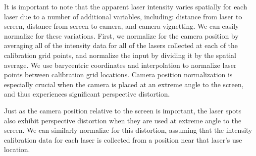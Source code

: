 \documentclass[review]{vgtc}                 %
\begin{document}

It is important to note that the apparent laser intensity varies
spatially for each laser due to a number of additional variables,
including: distance from laser to screen, distance from screen to
camera, and camera vignetting.  We can easily normalize for these
variations.  First, we normalize for the camera position by averaging
all of the intensity data for all of the lasers collected at each of
the calibration grid points, and normalize the input by dividing it by
the spatial average.  We use barycentric coordinates and interpolation
to normalize laser points between calibration grid locations.  Camera
position normalization is especially crucial when the camera is placed
at an extreme angle to the screen, and thus experiences significant
perspective distortion.


% 

Just as the camera position relative to the screen is important, the
laser spots also exhibit perspective distortion when they are used at
extreme angle to the screen.  We can similarly normalize for this
distortion, assuming that the intensity calibration data for each
laser is collected from a position near that laser's use location.
\end{document}
